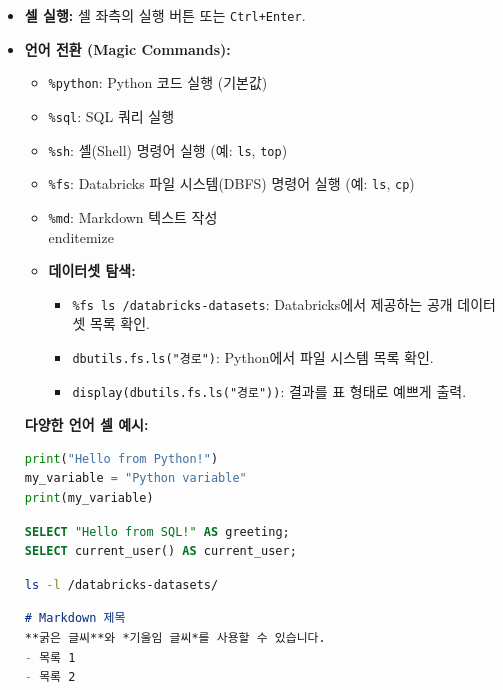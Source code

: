 \documentclass[11pt,a4paper]{article}
\begin{document}
\begin{itemize}
    \item \textbf{셀 실행:} 셀 좌측의 실행 버튼 또는 \texttt{Ctrl+Enter}.
    \item \textbf{언어 전환 (Magic Commands):}
        \begin{itemize}
            \item \texttt{\%python}: Python 코드 실행 (기본값)
            \item \texttt{\%sql}: SQL 쿼리 실행
            \item \texttt{\%sh}: 셸(Shell) 명령어 실행 (예: \texttt{ls}, \texttt{top})
            \item \texttt{\%fs}: Databricks 파일 시스템(DBFS) 명령어 실행 (예: \texttt{ls}, \texttt{cp})
            \item \texttt{\%md}: Markdown 텍스트 작성
        \\end{itemize}
    \item \textbf{데이터셋 탐색:}
        \begin{itemize}
            \item \texttt{\%fs ls /databricks-datasets}: Databricks에서 제공하는 공개 데이터셋 목록 확인.
            \item \texttt{dbutils.fs.ls("경로")}: Python에서 파일 시스템 목록 확인.
            \item \texttt{display(dbutils.fs.ls("경로"))}: 결과를 표 형태로 예쁘게 출력.
        \end{itemize}
\end{itemize}

\begin{examplebox}
\textbf{다양한 언어 셀 예시:}
\begin{lstlisting}[language=python, caption={Python 셀 예시}]
print("Hello from Python!")
my_variable = "Python variable"
print(my_variable)
\end{lstlisting}

\begin{lstlisting}[language=sql, caption={SQL 셀 예시}]
%sql
SELECT "Hello from SQL!" AS greeting;
SELECT current_user() AS current_user;
\end{lstlisting}

\begin{lstlisting}[language=sh, caption={Shell 셀 예시}]
%sh
ls -l /databricks-datasets/
\end{lstlisting}

\begin{lstlisting}[language=markdown, caption={Markdown 셀 예시}]
%md
# Markdown 제목
**굵은 글씨**와 *기울임 글씨*를 사용할 수 있습니다.
- 목록 1
- 목록 2
\end{lstlisting}
\end{examplebox}


\end{itemize}
\end{document}
